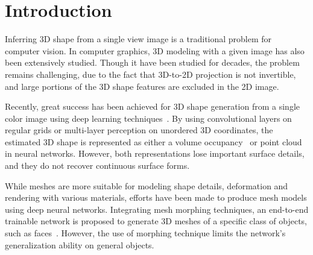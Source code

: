  \section{Introduction}
Inferring 3D shape from a single view image is a traditional problem for computer vision. In computer graphics, 3D modeling with a given image has also been extensively studied. 
Though it have been studied for decades, the problem remains challenging, due to the fact that 3D-to-2D projection is not invertible, and large portions of the 3D shape features are excluded in the 2D image. 


Recently, great success has been achieved for 3D shape generation from a single color image using deep learning techniques~\cite{3DR2N2,PSGN}. 
By using convolutional layers on regular grids or multi-layer
perception on unordered 3D coordinates, the estimated 3D shape is represented
as either a volume occupancy~\cite{3DR2N2} or point cloud~\cite{PSGN} in neural networks. 
However, both representations lose important surface details, and they do not recover continuous surface forms.


While meshes are more suitable for modeling shape details, deformation and rendering with various materials, efforts have been made to produce mesh models using deep neural networks. 
Integrating mesh morphing techniques, an end-to-end trainable network is proposed to generate 3D meshes of a specific class of objects, such as faces~\cite{endface}.
However, the use of morphing technique limits the network's generalization ability on general objects.
%

